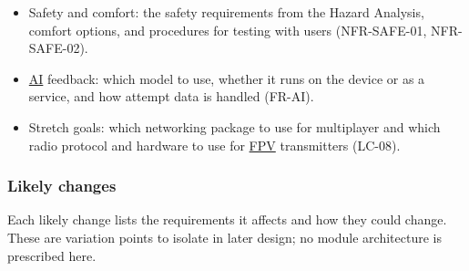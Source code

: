 \documentclass[12pt]{article}
\begin{document}
\begin{itemize}
\begin{itemize}
  best-run synchronization, friends and leaderboards, and verify credential protection
  (FR-ACC, FR-DAT, NFR-SEC-01).
  \item Safety and comfort: the safety requirements from the Hazard Analysis,
  comfort options, and procedures for testing with users (NFR-SAFE-01,
  NFR-SAFE-02).
  \item \hyperlink{glos:AI}{AI} feedback: which model to use, whether it runs on the device or as
  a service, and how attempt data is handled (FR-AI).
  \item Stretch goals: which networking package to use for multiplayer and
  which radio protocol and hardware to use for \hyperlink{glos:FPV}{FPV} transmitters (LC-08).
  \end{itemize}
\end{itemize}

\subsubsection*{Likely changes}

Each likely change lists the requirements it affects and how they could
change. These are variation points to isolate in later design; no module
architecture is prescribed here.
\end{document}
